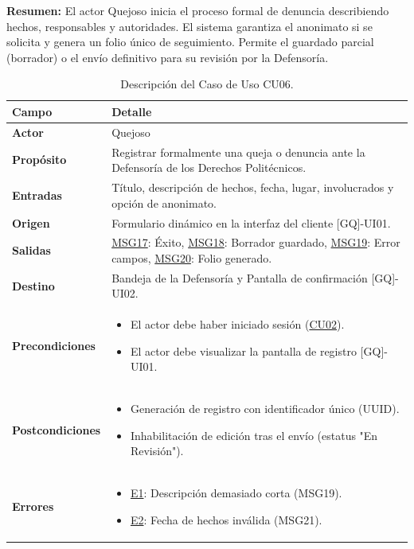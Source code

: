\begin{appendices}
\textbf{Resumen:} 
El actor Quejoso inicia el proceso formal de denuncia describiendo hechos, responsables y autoridades. El sistema garantiza el anonimato si se solicita y genera un folio único de seguimiento. Permite el guardado parcial (borrador) o el envío definitivo para su revisión por la Defensoría.

\begin{table}[htbp]
\centering
\small
\begin{tabular}{|p{3.5cm}|p{10.5cm}|}
\hline
\rowcolor[HTML]{EFEFEF} 
\textbf{Campo} & \textbf{Detalle} \\ \hline
\textbf{Actor} & Quejoso \\ \hline
\textbf{Propósito} & Registrar formalmente una queja o denuncia ante la Defensoría de los Derechos Politécnicos. \\ \hline
\textbf{Entradas} & Título, descripción de hechos, fecha, lugar, involucrados y opción de anonimato. \\ \hline
\textbf{Origen} & Formulario dinámico en la interfaz del cliente [GQ]-UI01. \\ \hline
\textbf{Salidas} & \hyperlink{msg:MSG17}{MSG17}: Éxito, \hyperlink{msg:MSG18}{MSG18}: Borrador guardado, \hyperlink{msg:MSG19}{MSG19}: Error campos, \hyperlink{msg:MSG20}{MSG20}: Folio generado. \\ \hline
\textbf{Destino} & Bandeja de la Defensoría y Pantalla de confirmación [GQ]-UI02. \\ \hline
\textbf{Precondiciones} & 
\begin{itemize}[nosep, leftmargin=*]
    \item El actor debe haber iniciado sesión (\hyperlink{anexo:casos_uso}{CU02}).
    \item El actor debe visualizar la pantalla de registro [GQ]-UI01.
\end{itemize} \\ \hline
\textbf{Postcondiciones} & 
\begin{itemize}[nosep, leftmargin=*]
    \item Generación de registro con identificador único (UUID).
    \item Inhabilitación de edición tras el envío (estatus "En Revisión").
\end{itemize} \\ \hline
\textbf{Errores} & 
\begin{itemize}[nosep, leftmargin=*]
    \item \hyperlink{err:E10}{E1}: Descripción demasiado corta (MSG19).
    \item \hyperlink{err:E11}{E2}: Fecha de hechos inválida (MSG21).
\end{itemize} \\ \hline
\end{tabular}
\caption{Descripción del Caso de Uso CU06.}
\label{tab:cu06_especificacion}
\end{table}


\end{appendices}
